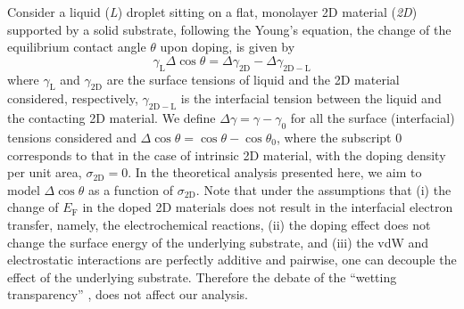 \documentclass[journal=jacsat,manuscript=article,email=true,hyperref=true,keywords=true]{achemso}
\begin{document}
Consider a liquid (\emph{L}) droplet sitting on a flat, monolayer 2D
material (\emph{2D}) supported by a solid substrate, following the Young’s
equation, the change of the equilibrium contact angle \(\theta\) upon
doping, is given by
\begin{equation}
\label{eqn-def-Young-Delta-theta}
\gamma_{\mathrm{L}} \Delta \cos\theta = \Delta \gamma_{\mathrm{2D}}
                                 - \Delta \gamma_{\mathrm{2D-L}}
\end{equation}
where \(\gamma_{\mathrm{L}}\) and \(\gamma_{\mathrm{2D}}\) are the surface
tensions of liquid and the 2D material considered,
respectively, \(\gamma_{\mathrm{2D-L}}\) is the interfacial tension between the
liquid and the contacting 2D material. We define \(\Delta \gamma =
\gamma - \gamma_{0}\) for all the surface (interfacial) tensions considered and
\(\Delta \cos \theta = \cos \theta - \cos \theta_{0}\), where the
subscript 0 corresponds to that in the case of intrinsic 2D material,
with the doping density per unit area, \(\sigma_{\mathrm{2D}} = 0\). In
the theoretical analysis presented here, we aim to model \(\Delta \cos
\theta\) as a function of \(\sigma_{\mathrm{2D}}\). Note that under the
assumptions that (i) the change of \(E_{\mathrm{F}}\) in the doped 2D
materials does not result in the interfacial electron transfer,
namely, the electrochemical reactions, (ii) the doping effect does not
change the surface energy of the underlying substrate, and (iii) the
vdW and electrostatic interactions are perfectly additive and
pairwise, one can decouple the effect of the underlying
substrate. Therefore the debate of the “wetting transparency”
\cite{rafiee_wetting_2012,shih_wetting_2013}, does not affect our analysis.
\end{document}
